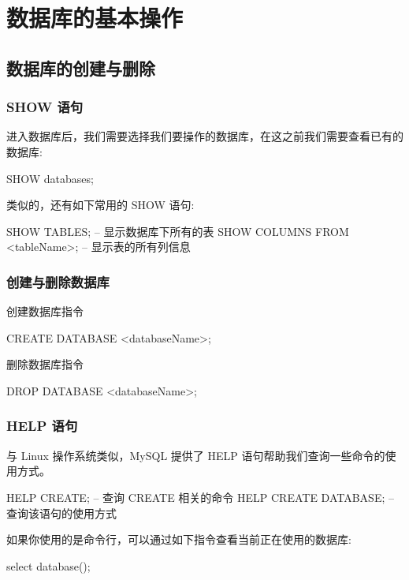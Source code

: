 \section{数据库的基本操作}

\subsection{数据库的创建与删除}

\subsubsection*{SHOW 语句}

进入数据库后，我们需要选择我们要操作的数据库，在这之前我们需要查看已有的数据库:

\begin{sql}
SHOW databases;
\end{sql}

类似的，还有如下常用的 SHOW 语句:

\begin{sql}
SHOW TABLES;    -- 显示数据库下所有的表
SHOW COLUMNS FROM <tableName>;  -- 显示表的所有列信息
\end{sql}

\subsubsection*{创建与删除数据库}

创建数据库指令
\begin{sql}
CREATE DATABASE <databaseName>;
\end{sql}

删除数据库指令
\begin{sql}
DROP DATABASE <databaseName>;
\end{sql}

\subsubsection*{HELP 语句}

与 Linux 操作系统类似，MySQL 提供了 HELP 语句帮助我们查询一些命令的使用方式。
\begin{sql}
HELP CREATE;    -- 查询 CREATE 相关的命令
HELP CREATE DATABASE;   -- 查询该语句的使用方式
\end{sql}

如果你使用的是命令行，可以通过如下指令查看当前正在使用的数据库:
\begin{sql}
select database();
\end{sql}

\newpage
